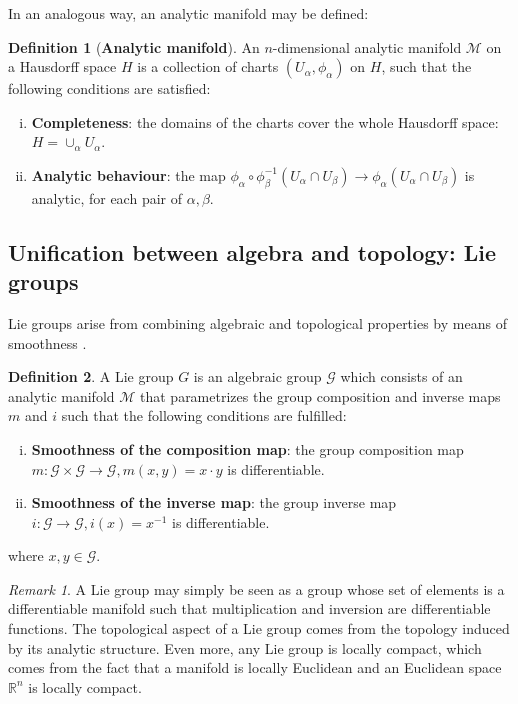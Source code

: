 \documentclass[12pt,a4paper]{report}
\theoremstyle{definition}
\newtheorem{definition}{Definition}
\theoremstyle{remark}
\newtheorem*{remark}{Remark}
\theoremstyle{remark}
\begin{document}
In an analogous way, an analytic manifold may be defined:
\begin{definition}[\textbf{Analytic manifold}]
An $n$-dimensional analytic manifold $\mathcal{M}$ on a Hausdorff space $H$ is a collection of charts $(U_\alpha,\phi_\alpha)$ on $H$, such that the following conditions are satisfied:
\begin{enumerate}[i.]
\item \textbf{Completeness}: the domains of the charts cover the whole Hausdorff space: $H=\cup_\alpha U_\alpha$.
\item \textbf{Analytic behaviour}: the map $\phi_\alpha\circ \phi_\beta^{-1}(U_\alpha\cap U_\beta)\rightarrow\phi_\alpha(U_\alpha\cap U_\beta)$ is analytic, for each pair of $\alpha,\beta$.
\end{enumerate}
\end{definition}

\subsection{Unification between algebra and topology: Lie groups}
Lie groups arise from combining algebraic and topological properties by means of smoothness \cite{gilmore}.
\begin{definition}
A Lie group $G$ is an algebraic group $\mathcal{G}$ which consists of an analytic manifold $\mathcal{M}$ that parametrizes the group composition and inverse maps $m$ and $i$ such that the following conditions are fulfilled:
\begin{enumerate}[i.]
\item \textbf{Smoothness of the composition map}: the group composition map $m:\mathcal{G}\times\mathcal{G}\rightarrow\mathcal{G},m(x,y)=x\cdot y$ is differentiable.
\item \textbf{Smoothness of the inverse map}: the group inverse map $i:\mathcal{G}\rightarrow\mathcal{G},i(x)=x^{-1}$ is differentiable.
\end{enumerate}
where $x,y\in\mathcal{G}$.
\end{definition}
\begin{remark} A Lie group may simply be seen as a group whose set of elements is a differentiable manifold such that multiplication and inversion are differentiable functions. The topological aspect of a Lie group comes from the topology induced by its analytic structure. Even more, any Lie group is locally compact, which comes from the fact that a manifold is locally Euclidean and an Euclidean space $\mathbb{R}^n$ is locally compact. 
\end{remark}
\end{document}
